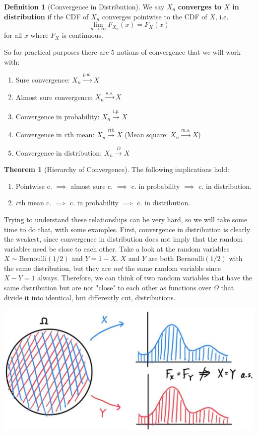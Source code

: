 \documentclass{article}
\theoremstyle{definition}
\newtheorem{theorem}{Theorem}[section]
\theoremstyle{remark}
\theoremstyle{definition}
\newtheorem{definition}{Definition}[section]
\begin{document}
\begin{definition}[Convergence in Distribution]
We say $X_n$ \textbf{converges to $X$ in distribution} if the CDF of $X_n$ converges pointwise to the CDF of $X$, i.e. 
\[\lim_{n \rightarrow \infty} F_{X_n} (x) = F_X (x)\]
for all $x$ where $F_{X}$ is continuous. 
\end{definition}

So for practical purposes there are 5 notions of convergence that we will work with: 
\begin{enumerate}
    \item Sure convergence: $X_n \xrightarrow{p.w.} X$ 
    \item Almost sure convergence: $X_n \xrightarrow{a.s.} X$ 
    \item Convergence in probability: $X_n \xrightarrow{i.p.} X$ 
    \item Convergence in $r$th mean: $X_n \xrightarrow{rth} X$ (Mean square: $X_n \xrightarrow{m.s.} X$) 
    \item Convergence in distribution: $X_n \xrightarrow{D} X$
\end{enumerate}

\begin{theorem}[Hierarchy of Convergence]
The following implications hold: 
\begin{enumerate}
    \item Pointwise c. $\implies$ almost sure c. $\implies$ c. in probability $\implies$ c. in distribution. 
    \item $r$th mean c. $\implies$ c. in probability $\implies$ c. in distribution. 
\end{enumerate}
\end{theorem}

Trying to understand these relationships can be very hard, so we will take some time to do that, with some examples. First, convergence in distribution is clearly the weakest, since convergence in distribution does not imply that the random variables need be close to each other. Take a look at the random variables $X \sim \mathrm{Bernoulli}(1/2)$ and $Y = 1 - X$. $X$ and $Y$ are both $\mathrm{Bernoulli}(1/2)$ with the same distribution, but they are \textit{not} the same random variable since $X - Y = 1$ always. Therefore, we can think of two random variables that have the same distribution but are not "close" to each other as functions over $\Omega$ that divide it into identical, but differently cut, distributions. 
\begin{center}
    \includegraphics[scale=0.23]{img/prob_in_distribution.jpg}
\end{center}
\end{document}

